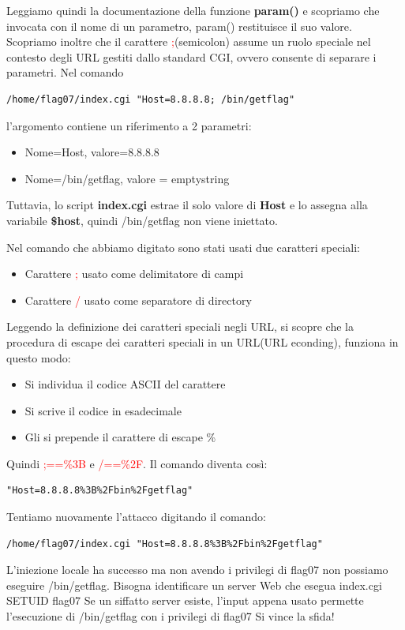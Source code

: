 Leggiamo quindi la documentazione della funzione \textbf{param()} e scopriamo che invocata con il nome di un parametro, param() restituisce il suo valore.
Scopriamo inoltre che il carattere \textcolor{red}{;}(semicolon) assume un ruolo speciale nel contesto degli URL gestiti dallo standard CGI, ovvero consente di separare i parametri.
Nel comando \begin{lstlisting}[style=bashstyle]
    /home/flag07/index.cgi "Host=8.8.8.8; /bin/getflag"
\end{lstlisting} l'argomento contiene un riferimento a 2 parametri:
\begin{itemize}
    \item Nome=Host, valore=8.8.8.8 
    \item Nome=/bin/getflag, valore = emptystring  
\end{itemize}
Tuttavia, lo script \textbf{index.cgi} estrae il solo valore di \textbf{Host} e lo assegna alla variabile \textbf{\$host}, quindi /bin/getflag non viene iniettato.

Nel comando che abbiamo digitato sono stati usati due caratteri speciali:
\begin{itemize}
    \item Carattere \textcolor{red}{;} usato come delimitatore di campi
    \item Carattere \textcolor{red}{/} usato come separatore di directory
\end{itemize}
Leggendo la definizione dei caratteri speciali negli URL, si scopre che la procedura di escape dei caratteri speciali in un URL(URL econding), funziona in questo modo:
\begin{itemize}
    \item Si individua il codice ASCII del carattere
    \item Si scrive il codice in esadecimale
    \item Gli si prepende il carattere di escape \%
\end{itemize}
Quindi \textcolor{red}{;==\%3B} e \textcolor{red}{/==\%2F}. Il comando diventa così:
\begin{lstlisting}[style=bashstyle]
    "Host=8.8.8.8%3B%2Fbin%2Fgetflag"
\end{lstlisting}
Tentiamo nuovamente l’attacco digitando il comando:
\begin{lstlisting}[style=bashstyle]
    /home/flag07/index.cgi "Host=8.8.8.8%3B%2Fbin%2Fgetflag"
\end{lstlisting}
L'iniezione locale ha successo ma non avendo i privilegi di flag07 non possiamo eseguire /bin/getflag.
Bisogna identificare un server Web che esegua index.cgi SETUID flag07 
Se un siffatto server esiste, l'input appena usato permette l'esecuzione di /bin/getflag con i privilegi di flag07 
Si vince la sfida!

